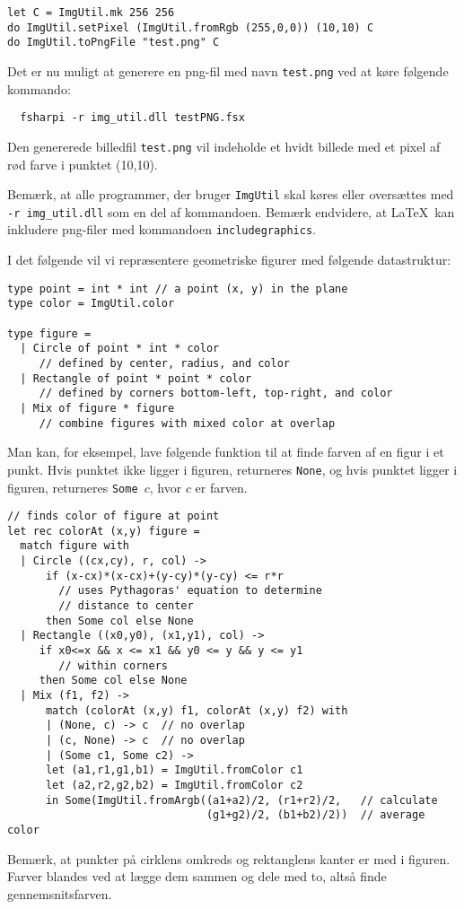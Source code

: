 \begin{lstlisting}[numbers=none,frame=none,mathescape]
let C = ImgUtil.mk 256 256
do ImgUtil.setPixel (ImgUtil.fromRgb (255,0,0)) (10,10) C
do ImgUtil.toPngFile "test.png" C
\end{lstlisting}

\noindent
Det er nu muligt at generere en png-fil med navn \texttt{test.png} ved
at køre følgende kommando:

\vspace{-4mm}
\begin{verbatim}
  fsharpi -r img_util.dll testPNG.fsx
\end{verbatim}
\vspace{-4mm}

\noindent
Den genererede billedfil \texttt{test.png} vil indeholde
et hvidt billede med et pixel af rød farve i punktet (10,10).

\noindent
Bemærk, at alle programmer, der bruger \texttt{ImgUtil} skal køres
eller oversættes med \texttt{-r img\_util.dll} som en del af
kommandoen.
%
Bemærk endvidere, at \LaTeX\ kan inkludere png-filer med
kommandoen \texttt{includegraphics}.

\vspace{2ex}

\noindent
I det følgende vil vi repræsentere geometriske figurer med følgende
datastruktur:

\begin{lstlisting}[numbers=none,frame=none,mathescape]
type point = int * int // a point (x, y) in the plane
type color = ImgUtil.color

type figure =
  | Circle of point * int * color
     // defined by center, radius, and color
  | Rectangle of point * point * color
     // defined by corners bottom-left, top-right, and color
  | Mix of figure * figure
     // combine figures with mixed color at overlap
\end{lstlisting}

\noindent
Man kan, for eksempel, lave følgende funktion til at finde farven af en
figur i et punkt.  Hvis punktet ikke ligger i figuren, returneres
\texttt{None}, og hvis punktet ligger i figuren, returneres
\texttt{Some $c$}, hvor $c$ er farven.

\begin{lstlisting}[numbers=none,frame=none,mathescape]
// finds color of figure at point
let rec colorAt (x,y) figure =
  match figure with
  | Circle ((cx,cy), r, col) ->
      if (x-cx)*(x-cx)+(y-cy)*(y-cy) <= r*r
        // uses Pythagoras' equation to determine
        // distance to center
      then Some col else None
  | Rectangle ((x0,y0), (x1,y1), col) ->
     if x0<=x && x <= x1 && y0 <= y && y <= y1
        // within corners
     then Some col else None
  | Mix (f1, f2) ->
      match (colorAt (x,y) f1, colorAt (x,y) f2) with
      | (None, c) -> c  // no overlap
      | (c, None) -> c  // no overlap
      | (Some c1, Some c2) ->
      let (a1,r1,g1,b1) = ImgUtil.fromColor c1
      let (a2,r2,g2,b2) = ImgUtil.fromColor c2
      in Some(ImgUtil.fromArgb((a1+a2)/2, (r1+r2)/2,   // calculate
                               (g1+g2)/2, (b1+b2)/2))  // average color
\end{lstlisting}

\noindent
Bemærk, at punkter på cirklens omkreds og rektanglens kanter er med i
figuren.  Farver blandes ved at lægge dem sammen og dele med to, altså
finde gennemsnitsfarven.
